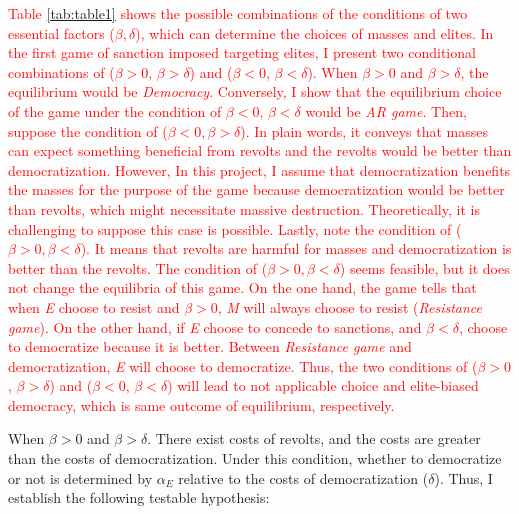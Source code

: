\documentclass[11pt]{article}
\newtheorem{hyp}{Hypothesis}
\begin{document}
\textcolor{red}{Table \ref{tab:table1} shows the possible combinations of the conditions of two essential factors ($\beta, \delta$), which can determine the choices of masses and elites. In the first game of sanction imposed targeting elites, I present two conditional combinations of ($\beta > 0$, $\beta > \delta$) and ($\beta < 0$, $\beta < \delta$). When $\beta > 0$ and $\beta > \delta$, the equilibrium would be \textit{Democracy}. Conversely, I show that the equilibrium choice of the game under the condition of $\beta < 0$, $\beta < \delta$ would be \textit{AR game}. Then, suppose the condition of ($\beta < 0, \beta > \delta$). In plain words, it conveys that masses can expect something beneficial from revolts and the revolts would be better than democratization. However, In this project, I assume that democratization benefits the masses for the purpose of the game because democratization would be better than revolts, which might necessitate massive destruction. Theoretically, it is challenging to suppose this case is possible. Lastly, note the condition of ($\beta > 0, \beta < \delta$). It means that revolts are harmful for masses and democratization is better than the revolts. The condition of ($\beta > 0, \beta < \delta$) seems feasible, but it does not change the equilibria of this game. On the one hand, the game tells that when \textit{E} choose to resist and $\beta>0$,  \textit{M} will always choose to resist (\textit{Resistance game}). On the other hand, if \textit{E} choose to concede to sanctions, and $\beta < \delta$,  choose to democratize because it is better. Between \textit{Resistance game} and democratization, \textit{E} will choose to democratize. Thus, the two conditions of ($\beta > 0$, $\beta > \delta$) and ($\beta < 0$, $\beta < \delta$) will lead to not applicable choice and elite-biased democracy, which is same outcome of equilibrium, respectively.}

When $\beta > 0$ and $\beta > \delta$. There exist costs of revolts, and the costs are greater than the costs of democratization. Under this condition, whether to democratize or not is determined by $\alpha_{E}$ relative to the costs of democratization ($\delta$). Thus, I establish the following testable hypothesis:


\end{document}
